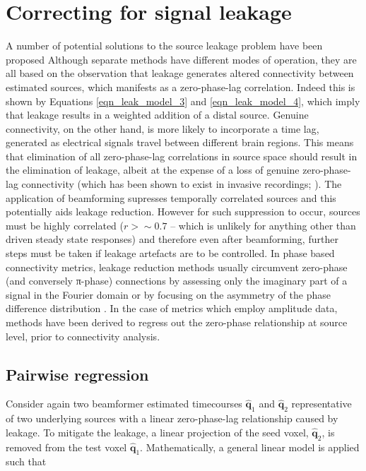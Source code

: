 \section{Correcting for signal leakage}\label{sec_signal_corr}
A number of potential solutions to the source leakage problem have been proposed \citep{Nolte2004,Stam2007,Brookes2012b,Hipp2012,Ewald2012,Marzetti2013,Brookes2014,ONeill2015A,Colclough2015,Wens2015} Although separate methods have different modes of operation, they are all based on the observation that leakage generates altered connectivity between estimated sources, which manifests as a zero-phase-lag correlation. Indeed this is shown by Equations \ref{eqn_leak_model_3} and \ref{eqn_leak_model_4}, which imply that leakage results in a weighted addition of a distal source. Genuine connectivity, on the other hand, is more likely to incorporate a time lag, generated as electrical signals travel between different brain regions. This means that elimination of all zero-phase-lag correlations in source space should result in the elimination of leakage, albeit at the expense of a loss of genuine zero-phase-lag connectivity (which has been shown to exist in invasive recordings; \citealp{Singer1999}). The application of beamforming supresses temporally correlated sources and this potentially aids leakage reduction. However for such suppression to occur, sources must be highly correlated ($r > \sim 0.7$ – which is unlikely for anything other than driven steady state responses) and therefore even after beamforming, further steps must be taken if leakage artefacts are to be controlled. In phase based connectivity metrics, leakage reduction methods usually circumvent zero-phase (and conversely π-phase) connections by assessing only the imaginary part of a signal in the Fourier domain \citep{Nolte2004,Nolte2008,Ewald2012,Marzetti2013} or by focusing on the asymmetry of the phase difference distribution \citep{Stam2007,Vinck2011}. In the case of metrics which employ amplitude data, methods have been derived to regress out the zero-phase relationship at source level, prior to connectivity analysis.

\subsection{Pairwise regression}
Consider again two beamformer estimated timecourses $\hat{\mathbf{q}}_1$ and $\hat{\mathbf{q}}_2$ representative of two underlying sources with a linear zero-phase-lag relationship caused by leakage. To mitigate the leakage, a linear projection of the seed voxel, $\hat{\mathbf{q}}_2$, is removed from the test voxel $\hat{\mathbf{q}}_1$. Mathematically, a general linear model is applied such that

